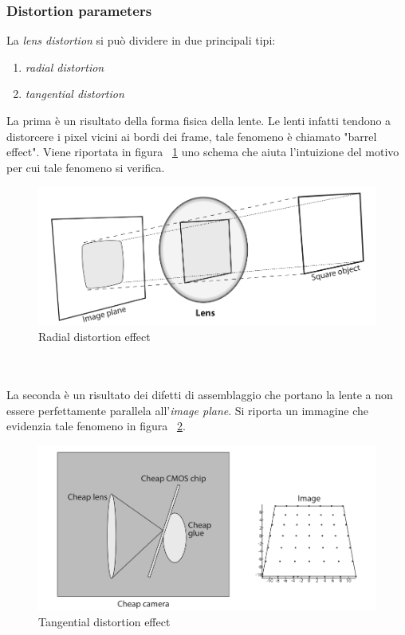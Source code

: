 \subsubsection{Distortion parameters}

La \textit{lens distortion} si può dividere in due principali tipi:
\begin{enumerate}
	\item \textit{radial distortion}
	\item \textit{tangential distortion}
\end{enumerate}

La prima è un risultato della forma fisica della lente. Le lenti infatti tendono a distorcere i pixel vicini ai bordi dei frame, tale fenomeno è chiamato "barrel effect". Viene riportata in figura ~\ref{fig:calib4} uno schema che aiuta l'intuizione del motivo per cui tale fenomeno si verifica.
\begin{figure}[htpb] 
\centering 
\includegraphics[scale=0.3]{./images/calib4.png} 
\caption{Radial distortion effect} 
\label{fig:calib4}
\end{figure} 
\\ \\
La seconda è un risultato dei difetti di assemblaggio che portano la lente a non essere perfettamente parallela all'\textit{image plane}. Si riporta un immagine che evidenzia tale fenomeno in figura ~\ref{fig:calib5}.
\begin{figure}[htpb] 
\centering 
\includegraphics[scale=0.3]{./images/calib5.png} 
\caption{Tangential distortion effect} 
\label{fig:calib5}
\end{figure} 

